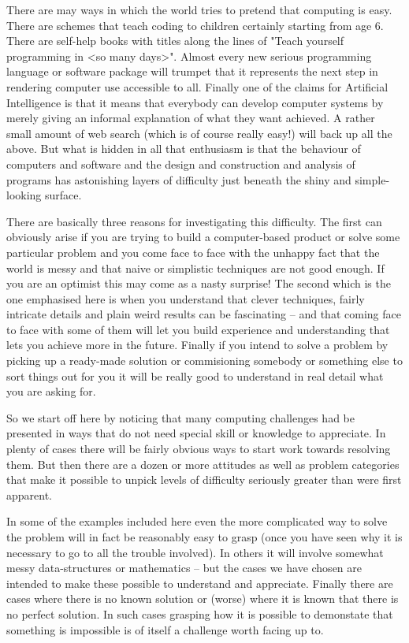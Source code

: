 There are may ways in which the world tries to pretend that computing
is easy. There are schemes that teach coding to children certainly 
starting from age 6. There are self-help books with titles along the lines 
of "Teach yourself programming in <so many days>". Almost every new 
serious programming language or software package will trumpet that it
represents the next step in rendering computer use accessible to all.
Finally one of the claims for Artificial Intelligence is that it means 
that everybody can develop computer systems by merely giving an informal
explanation of what they want achieved. A rather small amount of web 
search (which is of course really easy!) will back up all the above.
But what is hidden in all that enthusiasm is that the behaviour of
computers and software and the design and construction and analysis  of 
programs has astonishing layers of difficulty just beneath the shiny
and simple-looking surface.

There are basically three reasons for investigating this difficulty. The
first can obviously arise if you are trying to build a computer-based
product or solve some particular problem and you come face to face with 
the unhappy fact that the world is messy and that naive or simplistic
techniques are not good enough. If you are an optimist this may come as a
nasty surprise! The second which is the one emphasised here is when you
understand that clever techniques, fairly intricate details and plain
weird results can be fascinating -- and that coming face to face with some 
of them will let you build experience and understanding that lets you 
achieve more in the future. Finally if you intend to solve a problem by
picking up a ready-made solution or commisioning somebody or something else
to sort things out for you it will be really good to understand in
real detail what you are asking for.

So we start off here by noticing that many computing challenges had be
presented in ways that do not need special skill or knowledge to 
appreciate. In plenty of cases there will be fairly obvious ways to start 
work towards resolving them. But then there are a dozen or more attitudes
as well as problem categories that make it possible to unpick levels of 
difficulty seriously greater than were first apparent.

In some of the examples included here even the more complicated way to
solve the problem will in fact be reasonably easy to grasp (once you have
seen why it is necessary to go to all the trouble involved). In others it 
will involve somewhat messy data-structures or mathematics -- but the 
cases we have chosen are intended to make these possible to understand and 
appreciate. Finally there are cases where there is no known solution or
(worse) where it is known that there is no perfect solution. In such cases
grasping how it is possible to demonstate that something is impossible is 
of itself a challenge worth facing up to.


